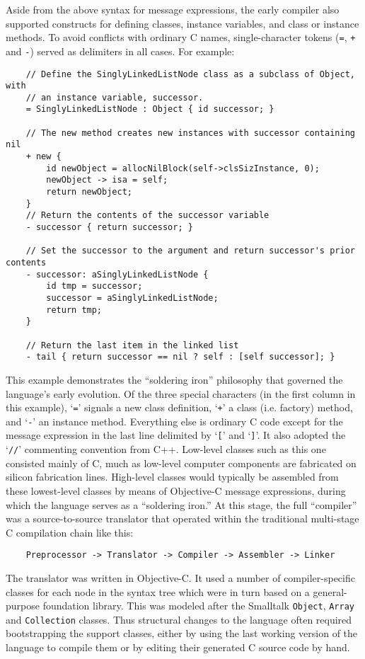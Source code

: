 \documentclass[acmsmall,screen]{acmart}
\begin{document}
Aside from the above syntax for message expressions, the early compiler also supported constructs for defining classes, instance variables, and class or instance methods. To avoid conflicts with ordinary C names, single-character tokens (\verb|=|, \verb|+| and \verb|-|) served as delimiters in all cases. For example:
\begin{verbatim}
    // Define the SinglyLinkedListNode class as a subclass of Object, with 
    // an instance variable, successor.
    = SinglyLinkedListNode : Object { id successor; }

    // The new method creates new instances with successor containing nil
    + new {
        id newObject = allocNilBlock(self->clsSizInstance, 0);
        newObject -> isa = self;
        return newObject;
    }
    // Return the contents of the successor variable
    - successor { return successor; }

    // Set the successor to the argument and return successor's prior contents
    - successor: aSinglyLinkedListNode {
        id tmp = successor;
        successor = aSinglyLinkedListNode;
        return tmp;
    }

    // Return the last item in the linked list
    - tail { return successor == nil ? self : [self successor]; }
\end{verbatim}
This example demonstrates the ``soldering iron'' philosophy that governed the language's early evolution. Of the three special characters (in the first column in this example), `\verb|=|' signals a new class definition, `\verb|+|' a class (i.e. factory) method, and `\verb|-|' an instance method. Everything else is ordinary C code except for the message expression in the last line delimited by `\verb|[|' and `\verb|]|'. It also adopted the `\verb|//|' commenting convention from C++. Low-level classes such as this one consisted mainly of C, much as low-level computer components are fabricated on silicon fabrication lines. High-level classes would typically be assembled from these lowest-level classes by means of Objective-C message expressions, during which the language serves as a ``soldering iron.''
At this stage, the full ``compiler'' was a source-to-source translator that operated within the traditional multi-stage C compilation chain like this:
\begin{verbatim}
    Preprocessor -> Translator -> Compiler -> Assembler -> Linker
\end{verbatim}
The translator was written in Objective-C. It used a number of compiler-specific classes for each node in the syntax tree which were in turn based on a general-purpose foundation library. This was modeled after the Smalltalk \verb|Object|, \verb|Array| and \verb|Collection| classes. Thus structural changes to the language often required bootstrapping the support classes, either by using the last working version of the language to compile them or by editing their generated C source code by hand.
\end{document}
